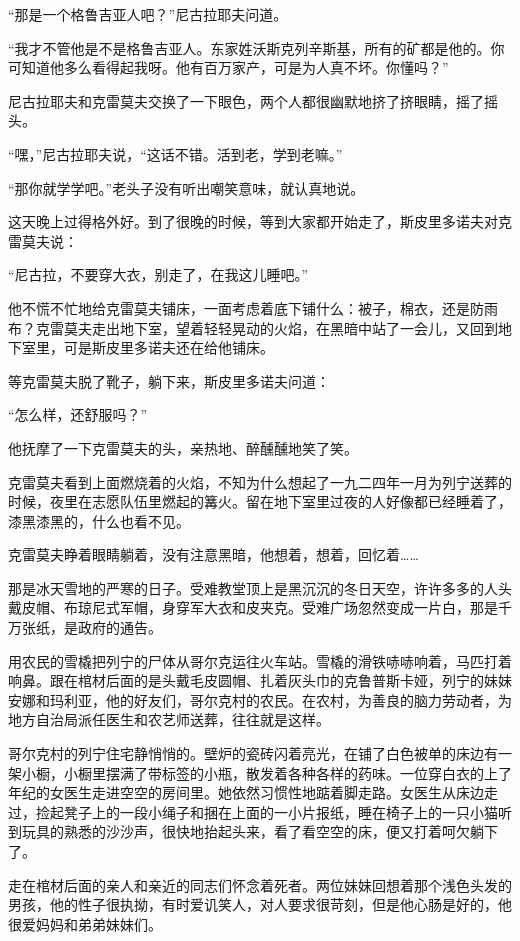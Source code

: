 “那是一个格鲁吉亚人吧？”尼古拉耶夫问道。

“我才不管他是不是格鲁吉亚人。东家姓沃斯克列辛斯基，所有的矿都是他的。你可知道他多么看得起我呀。他有百万家产，可是为人真不坏。你懂吗？”

尼古拉耶夫和克雷莫夫交换了一下眼色，两个人都很幽默地挤了挤眼睛，摇了摇头。

“嘿，”尼古拉耶夫说，“这话不错。活到老，学到老嘛。”

“那你就学学吧。”老头子没有听出嘲笑意味，就认真地说。

这天晚上过得格外好。到了很晚的时候，等到大家都开始走了，斯皮里多诺夫对克雷莫夫说：

“尼古拉，不要穿大衣，别走了，在我这儿睡吧。”

他不慌不忙地给克雷莫夫铺床，一面考虑着底下铺什么：被子，棉衣，还是防雨布？克雷莫夫走出地下室，望着轻轻晃动的火焰，在黑暗中站了一会儿，又回到地下室里，可是斯皮里多诺夫还在给他铺床。

等克雷莫夫脱了靴子，躺下来，斯皮里多诺夫问道：

“怎么样，还舒服吗？”

他抚摩了一下克雷莫夫的头，亲热地、醉醺醺地笑了笑。

克雷莫夫看到上面燃烧着的火焰，不知为什么想起了一九二四年一月为列宁送葬的时候，夜里在志愿队伍里燃起的篝火。留在地下室里过夜的人好像都已经睡着了，漆黑漆黑的，什么也看不见。

克雷莫夫睁着眼睛躺着，没有注意黑暗，他想着，想着，回忆着……

那是冰天雪地的严寒的日子。受难教堂顶上是黑沉沉的冬日天空，许许多多的人头戴皮帽、布琼尼式军帽，身穿军大衣和皮夹克。受难广场忽然变成一片白，那是千万张纸，是政府的通告。

用农民的雪橇把列宁的尸体从哥尔克运往火车站。雪橇的滑铁哧哧响着，马匹打着响鼻。跟在棺材后面的是头戴毛皮圆帽、扎着灰头巾的克鲁普斯卡娅，列宁的妹妹安娜和玛利亚，他的好友们，哥尔克村的农民。在农村，为善良的脑力劳动者，为地方自治局派任医生和农艺师送葬，往往就是这样。

哥尔克村的列宁住宅静悄悄的。壁炉的瓷砖闪着亮光，在铺了白色被单的床边有一架小橱，小橱里摆满了带标签的小瓶，散发着各种各样的药味。一位穿白衣的上了年纪的女医生走进空空的房间里。她依然习惯性地踮着脚走路。女医生从床边走过，捡起凳子上的一段小绳子和捆在上面的一小片报纸，睡在椅子上的一只小猫听到玩具的熟悉的沙沙声，很快地抬起头来，看了看空空的床，便又打着呵欠躺下了。

走在棺材后面的亲人和亲近的同志们怀念着死者。两位妹妹回想着那个浅色头发的男孩，他的性子很执拗，有时爱讥笑人，对人要求很苛刻，但是他心肠是好的，他很爱妈妈和弟弟妹妹们。

